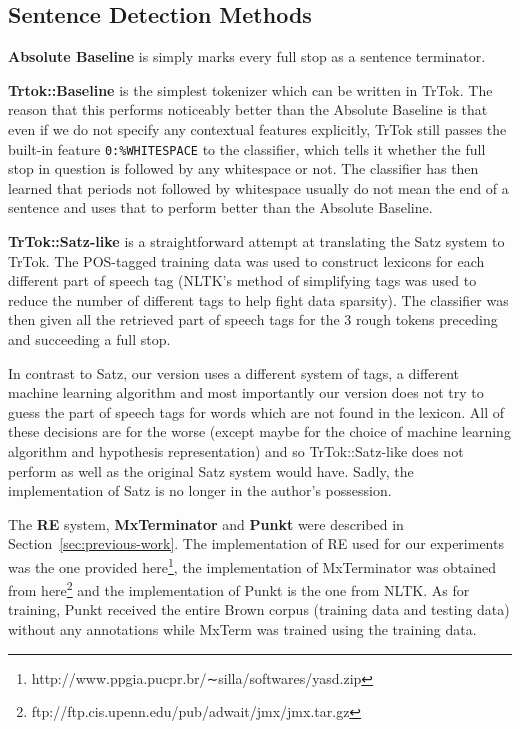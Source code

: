 \subsection{Sentence Detection Methods}

\textbf{Absolute Baseline} is simply marks every full stop as a
sentence terminator.

\textbf{Trtok::Baseline} is the simplest tokenizer which can be
written in TrTok. The reason that this performs noticeably better than
the Absolute Baseline is that even if we do not specify any contextual
features explicitly, TrTok still passes the built-in feature
\texttt{0:\%WHITESPACE} to the classifier, which tells it whether the
full stop in question is followed by any whitespace or not. The
classifier has then learned that periods not followed by whitespace
usually do not mean the end of a sentence and uses that to perform
better than the Absolute Baseline.

\textbf{TrTok::Satz-like} is a straightforward attempt at translating
the Satz system to TrTok. The POS-tagged training data was used to
construct lexicons for each different part of speech tag (NLTK's
method of simplifying tags was used to reduce the number of different
tags to help fight data sparsity). The classifier was then given all
the retrieved part of speech tags for the 3 rough tokens preceding and
succeeding a full stop.

In contrast to Satz, our version uses a different system of tags, a
different machine learning algorithm and most importantly our version
does not try to guess the part of speech tags for words which are not
found in the lexicon. All of these decisions are for the worse (except
maybe for the choice of machine learning algorithm and hypothesis
representation) and so TrTok::Satz-like does not perform as well as
the original Satz system would have. Sadly, the implementation of Satz
is no longer in the author's possession.

The \textbf{RE} system, \textbf{MxTerminator} and \textbf{Punkt} were
described in Section~\ref{sec:previous-work}. The implementation of RE
used for our experiments was the one provided
here\footnote{http://www.ppgia.pucpr.br/∼silla/softwares/yasd.zip},
the implementation of MxTerminator was obtained from
here\footnote{ftp://ftp.cis.upenn.edu/pub/adwait/jmx/jmx.tar.gz} and
the implementation of Punkt is the one from NLTK. As for training,
Punkt received the entire Brown corpus (training data and testing
data) without any annotations while MxTerm was trained using the
training data.

